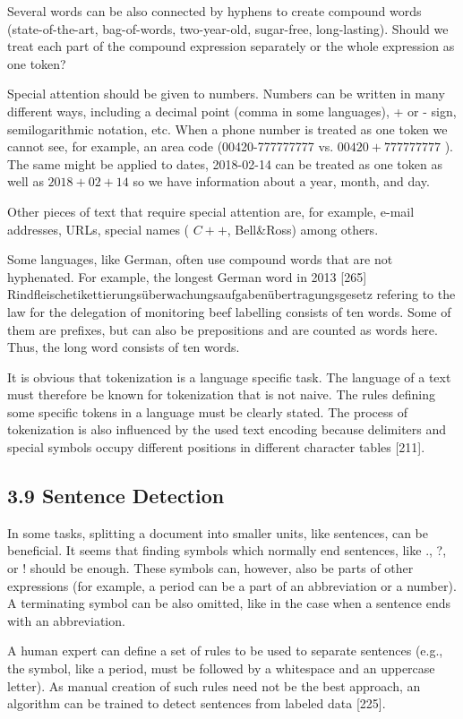 \documentclass[10pt]{book}
\begin{document}
Several words can be also connected by hyphens to create compound words (state-of-the-art, bag-of-words, two-year-old, sugar-free, long-lasting). Should we treat each part of the compound expression separately or the whole expression as one token?

Special attention should be given to numbers. Numbers can be written in many different ways, including a decimal point (comma in some languages), + or - sign, semilogarithmic notation, etc. When a phone number is treated as one token we cannot see, for example, an area code (00420-777777777 vs. $00420+777777777$ ). The same might be applied to dates, 2018-02-14 can be treated as one token as well as $2018+02+14$ so we have information about a year, month, and day.

Other pieces of text that require special attention are, for example, e-mail addresses, URLs, special names ( $C++$, Bell\&Ross) among others.

Some languages, like German, often use compound words that are not hyphenated. For example, the longest German word in 2013 [265] Rindfleischetikettierungsüberwachungsaufgabenübertragungsgesetz refering to the law for the delegation of monitoring beef labelling consists of ten words. Some of them are prefixes, but can also be prepositions and are counted as words here. Thus, the long word consists of ten words.

It is obvious that tokenization is a language specific task. The language of a text must therefore be known for tokenization that is not naive. The rules defining some specific tokens in a language must be clearly stated. The process of tokenization is also influenced by the used text encoding because delimiters and special symbols occupy different positions in different character tables [211].

\subsection*{3.9 Sentence Detection}
In some tasks, splitting a document into smaller units, like sentences, can be beneficial. It seems that finding symbols which normally end sentences, like ., ?, or ! should be enough. These symbols can, however, also be parts of other\\
expressions (for example, a period can be a part of an abbreviation or a number). A terminating symbol can be also omitted, like in the case when a sentence ends with an abbreviation.

A human expert can define a set of rules to be used to separate sentences (e.g., the symbol, like a period, must be followed by a whitespace and an uppercase letter). As manual creation of such rules need not be the best approach, an algorithm can be trained to detect sentences from labeled data [225].
\end{document}
